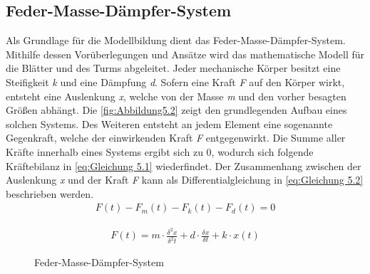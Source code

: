 \subsection{Feder-Masse-Dämpfer-System}
Als Grundlage für die Modellbildung dient das Feder-Masse-Dämpfer-System. Mithilfe dessen Vorüberlegungen und Ansätze wird das mathematische Modell für die Blätter und des Turms abgeleitet. Jeder mechanische Körper besitzt eine Steifigkeit \textit{k} und eine Dämpfung \textit{d}. Sofern eine Kraft \textit{F} auf den Körper wirkt, entsteht eine Auslenkung \textit{x}, welche von der Masse \textit{m} und den vorher besagten Größen abhängt. Die \autoref{fig:Abbildung5.2}{} zeigt den grundlegenden Aufbau eines solchen Systems.
Des Weiteren entsteht an jedem Element eine sogenannte Gegenkraft, welche der einwirkenden Kraft \textit{F} entgegenwirkt. Die Summe aller Kräfte innerhalb eines Systems ergibt sich zu 0, wodurch sich folgende Kräftebilanz in \autoref{eq:Gleichung 5.1} wiederfindet. Der Zusammenhang zwischen der Auslenkung \textit{x} und der Kraft \textit{F} kann als Differentialgleichung in \autoref{eq:Gleichung 5.2} beschrieben werden.
\begin{align}
    F(t) - F_{m}(t) - F_{k}(t) - F_{d}(t) = 0 
    \label{eq:Gleichung 5.1}
\end{align}

\begin{align}
    F(t) = m \cdot \frac{\delta^2x}{\delta^2t} + d \cdot \frac{\delta x}{\delta t} + k \cdot x(t)
    \label{eq:Gleichung 5.2}
\end{align}
\begin{figure}[H]
    \centering
    \caption{Feder-Masse-Dämpfer-System}
    \label{fig:Abbildung5.2}
\end{figure}
\newpage
